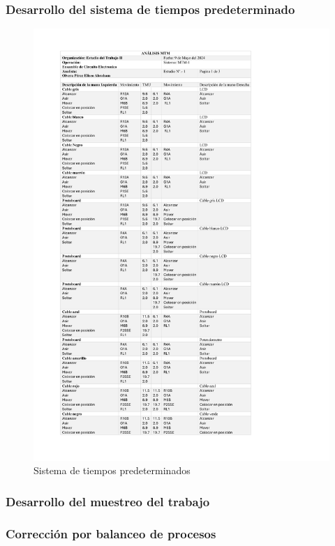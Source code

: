     \subsubsection{Desarrollo del sistema de tiempos predeterminado}
    \begin{figure}[H]
        \centering
        \includegraphics[scale=0.250]{21/img/analisisMTM.pdf}
        \caption{Sistema de tiempos predeterminados}
        \label{fig:analisisMTM}
    \end{figure}
    \subsubsection{Desarrollo del muestreo del trabajo}
    \subsubsection{Corrección por balanceo de procesos}
